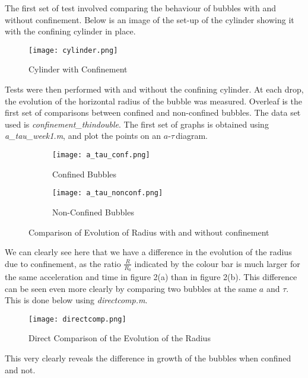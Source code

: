 \documentclass{article}
\newcommand{\at}{$a$-$\tau$\,}
\begin{document}
The first set of test involved comparing the behaviour of bubbles with and without confinement. Below is an image of the set-up of the cylinder showing it with the confining cylinder in place.\\
\begin{figure}[H]
    \centering
    \texttt{[image: cylinder.png]}
    \caption{Cylinder with Confinement}
\end{figure}
Tests were then performed with and without the confining cylinder. At each drop, the evolution of the horizontal radius of the bubble was measured. Overleaf is the first set of comparisons between confined and non-confined bubbles. The data set used is \emph{confinement\_thindouble}. The first set of graphs is obtained using \emph{a\_tau\_week1.m}, and plot the points on an \at diagram.
\begin{figure}[H]
  \centering
  \begin{subfigure}[b]{0.49\linewidth}
    \texttt{[image: a\_tau\_conf.png]}
    \caption{Confined Bubbles}
  \end{subfigure}
  \begin{subfigure}[b]{0.49\linewidth}
    \texttt{[image: a\_tau\_nonconf.png]}
    \caption{Non-Confined Bubbles}
  \end{subfigure}
  \caption{Comparison of Evolution of Radius with and without confinement}
\end{figure}
We can clearly see here that we have a difference in the evolution of the radius due to confinement, as the ratio $\frac{R}{R_0}$ indicated by the colour bar is much larger for the same acceleration and time in figure 2(a) than in figure 2(b). This difference can be seen even more clearly by comparing two bubbles at the same $a$ and $\tau$. This is done below using \emph{directcomp.m}.
\begin{figure}[H]
    \centering
    \texttt{[image: directcomp.png]}
    \caption{Direct Comparison of the Evolution of the Radius}
\end{figure}
This very clearly reveals the difference in growth of the bubbles when confined and not.
\end{document}
